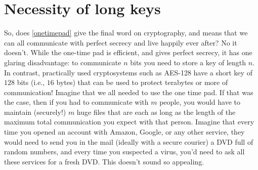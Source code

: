 
\section{Necessity of long keys}\label{1-Necessity-of-long-keys}

So, does \cref{onetimepad} give the final word on cryptography, and
means that we can all communicate with perfect secrecy and live happily
ever after? No it doesn't. While the one-time pad is efficient, and
gives perfect secrecy, it has one glaring disadvantage: to communicate
\(n\) bits you need to store a key of length \(n\). In contrast,
practically used cryptosystems such as AES-128 have a short key of
\(128\) bits (i.e., \(16\) bytes) that can be used to protect terabytes
or more of communication! Imagine that we all needed to use the one time
pad. If that was the case, then if you had to communicate with \(m\)
people, you would have to maintain (securely!) \(m\) huge files that are
each as long as the length of the maximum total communication you expect
with that person. Imagine that every time you opened an account with
Amazon, Google, or any other service, they would need to send you in the
mail (ideally with a secure courier) a DVD full of random numbers, and
every time you suspected a virus, you'd need to ask all these services
for a fresh DVD. This doesn't sound so appealing.

